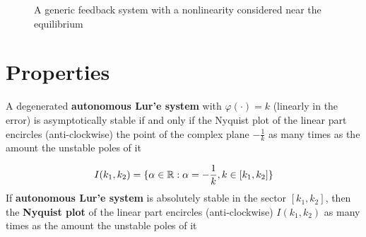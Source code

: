 \begin{figure}[htb]
    \centering
    \caption{A generic feedback system with a nonlinearity considered near the equilibrium}
    \label{fig:generic-feedback-system-equilibrium}
\end{figure}

\section{Properties}

\begin{theorem}\label{thm:nyquist}
A degenerated \textbf{autonomous Lur'e system} with $\varphi(\cdot) = k$ (linearly in the error) is asymptotically stable if and only if the Nyquist plot of the linear part encircles (anti-clockwise) the point of the complex plane $-\frac{1}{k}$ as many times as the amount the unstable poles of it
\end{theorem}

\begin{theorem}\label{thm:lure-nyquist}
    \[
        I(k_1,k_2) = \{\alpha \in \mathbb{R} : \alpha = -\frac{1}{k}, k \in [k_1,k_2]\}
    \]
    If \textbf{autonomous Lur'e system} is absolutely stable in the sector $[k_1,k_2]$, then the \textbf{Nyquist plot} of the linear part encircles (anti-clockwise) $I(k_1,k_2)$ as many times as the amount the unstable poles of it
\end{theorem}

